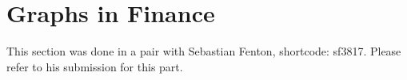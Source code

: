 \chapter{Graphs in Finance}

This section was done in a pair with Sebastian Fenton, shortcode: sf3817. Please refer to his submission for this part.
